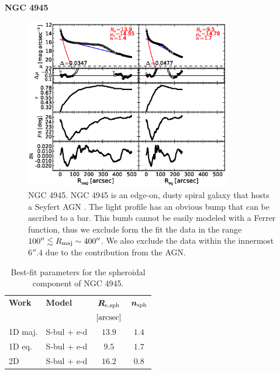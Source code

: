 \documentclass[preprint2]{emulateapj}
\newcommand{\fitfigurewidth}{0.8\textwidth}
\begin{document}
  \clearpage\newpage\noindent
  {\bf NGC 4945 \\}

  \begin{figure}[h]
  \begin{center}
  \includegraphics[width=\fitfigurewidth]{images/n4945_1Dfit.eps}
  \caption{NGC 4945.
  NGC 4945 is an edge-on, dusty spiral galaxy that hosts a Seyfert AGN \citep{lin2011}.
  The light profile has an obvious bump that can be ascribed to a bar.
  This bumb cannot be easily modeled with a Ferrer function, thus we exclude form the fit the data in the range $100'' \lesssim R_{\rm maj} \sim 400''$.
  We also exclude the data within the innermost $6''.4$ due to the contribution from the AGN.
  }
  \end{center}
  \end{figure}

  \begin{table}[h]
  \small
  \caption{Best-fit parameters for the spheroidal component of NGC 4945.}
  \begin{center}
  \begin{tabular}{llcc}
  \hline
  {\bf Work} & {\bf Model}   & $\bm R_{\rm e,sph}$    & $\bm n_{\rm sph}$ \\
    &  &  $[\rm arcsec]$ & \\
  \hline
  1D maj. & S-bul + e-d & $13.9$  &  $1.4$ \\
  1D eq.  & S-bul + e-d & $9.5$   &  $1.7$ \\
  2D      & S-bul + e-d & $16.2$  &  $0.8$ \\
  \hline
  \end{tabular}
  \end{center}
  \label{tab:n4945}
  \end{table}
\end{document}
